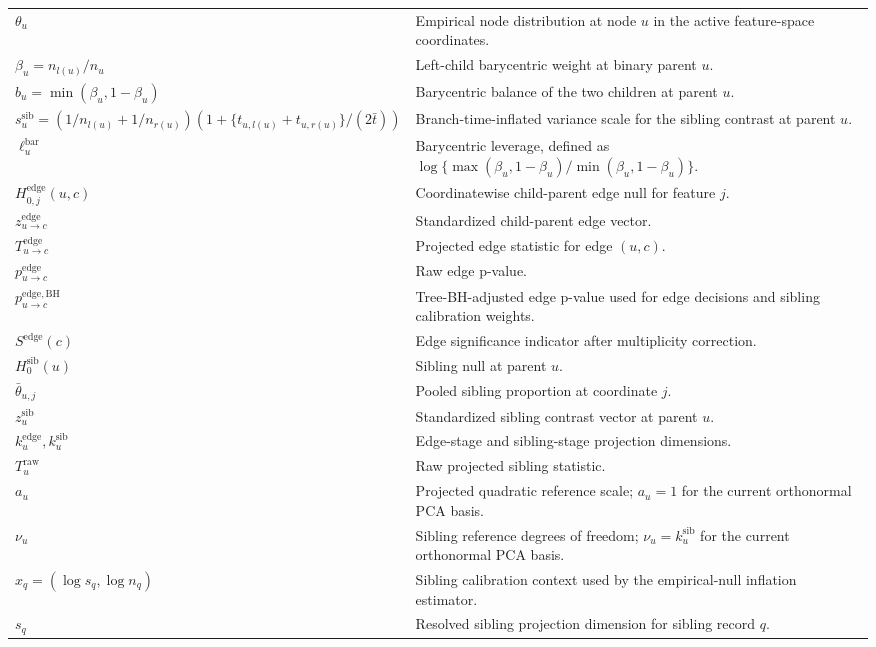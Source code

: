 {\begin{longtable}{@{}p{}p{}@{}}
$\theta_u$ & Empirical node distribution at node $u$ in the active feature-space coordinates. \\
$\beta_u=n_{l(u)}/n_u$ & Left-child barycentric weight at binary parent $u$. \\
$b_u=\min(\beta_u,1-\beta_u)$ & Barycentric balance of the two children at parent $u$. \\
$s_u^{\mathrm{sib}}=(1/n_{l(u)}+1/n_{r(u)})(1+\{t_{u,l(u)}+t_{u,r(u)}\}/(2\bar t))$ & Branch-time-inflated variance scale for the sibling contrast at parent $u$. \\
$\ell_u^{\mathrm{bar}}$ & Barycentric leverage, defined as $\log\{\max(\beta_u,1-\beta_u)/\min(\beta_u,1-\beta_u)\}$. \\
$H_{0,j}^{\mathrm{edge}}(u,c)$ & Coordinatewise child-parent edge null for feature $j$. \\
$z_{u \to c}^{\mathrm{edge}}$ & Standardized child-parent edge vector. \\
$T_{u \to c}^{\mathrm{edge}}$ & Projected edge statistic for edge $(u,c)$. \\
$p_{u \to c}^{\mathrm{edge}}$ & Raw edge p-value. \\
$p_{u \to c}^{\mathrm{edge,BH}}$ & Tree-BH-adjusted edge p-value used for edge decisions and sibling calibration weights. \\
$S^{\mathrm{edge}}(c)$ & Edge significance indicator after multiplicity correction. \\
$H_0^{\mathrm{sib}}(u)$ & Sibling null at parent $u$. \\
$\bar\theta_{u,j}$ & Pooled sibling proportion at coordinate $j$. \\
$z_u^{\mathrm{sib}}$ & Standardized sibling contrast vector at parent $u$. \\
$k_u^{\mathrm{edge}}, k_u^{\mathrm{sib}}$ & Edge-stage and sibling-stage projection dimensions. \\
$T_u^{\mathrm{raw}}$ & Raw projected sibling statistic. \\
$a_u$ & Projected quadratic reference scale; $a_u=1$ for the current orthonormal PCA basis. \\
$\nu_u$ & Sibling reference degrees of freedom; $\nu_u=k_u^{\mathrm{sib}}$ for the current orthonormal PCA basis. \\
$x_q=(\log s_q,\log n_q)$ & Sibling calibration context used by the empirical-null inflation estimator. \\
$s_q$ & Resolved sibling projection dimension for sibling record $q$. \\

\end{longtable}}
